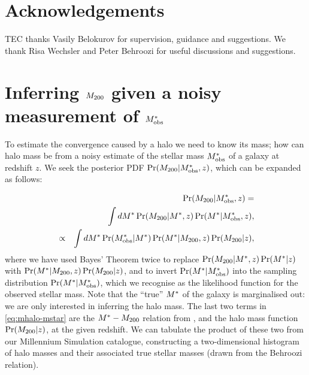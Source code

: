 \documentclass[useAMS,usenatbib,a4paper]{mn2e}
\begin{document}

\section*{Acknowledgements}
 
TEC thanks Vasily Belokurov for supervision, guidance and suggestions.
We thank Risa Wechsler and Peter Behroozi 
for useful discussions and suggestions.



\appendix


\section{Inferring $M_{200}$ given a noisy measurement of $M^{*}_{\rm obs}$}
\label{appendix:MSMH}

To estimate the convergence caused by a halo we need to know its mass; how can 
halo mass be \infered from a noisy estimate of the stellar mass $M^{*}_{\rm obs}$
of a galaxy at redshift $z$. We seek the posterior
PDF $\Pr(M_{200}|M^{*}_{\rm obs},z)$, which can be expanded as follows:

\begin{eqnarray}
&& \Pr(M_{200}|M^{*}_{\rm obs},z) = \notag\\
&& \int dM^{*} \Pr(M_{200}|M^{*},z) \Pr(M^{*}|M^{*}_{\rm obs},z), \notag\\
&\propto& \int dM^{*} \Pr(M^{*}_{\rm obs}|M^{*}) \Pr(M^{*}|M_{200},z) \Pr(M_{200}|z),
\label{eq:mhalo-mstar}
\end{eqnarray}
where we have used Bayes' Theorem twice to replace
$\Pr(M_{200}|M^{*},z) \Pr(M^{*}|z)$ with 
$\Pr(M^{*}|M_{200},z) \Pr(M_{200}|z)$, and 
to invert $\Pr(M^{*}|M^{*}_{\rm obs})$ into the sampling
distribution $\Pr(M^{*}|M^{*}_{\rm obs})$, which we recognise as the likelihood
function for the observed stellar mass. Note that the ``true'' $M^{*}$ of the
galaxy is marginalised out: we are only interested in inferring the halo
mass. The last two terms in
\eqref{eq:mhalo-mstar} are the $M^{*}-M_{200}$ relation from
\citet{BehrooziEtal2010}, and the halo mass function $\Pr(M_{200}|z)$, at the
given redshift. We can
tabulate the product of these two from our Millennium Simulation catalogue,
constructing a two-dimensional histogram of halo masses and their associated
true stellar masses (drawn from the Behroozi relation). 
\end{document}
